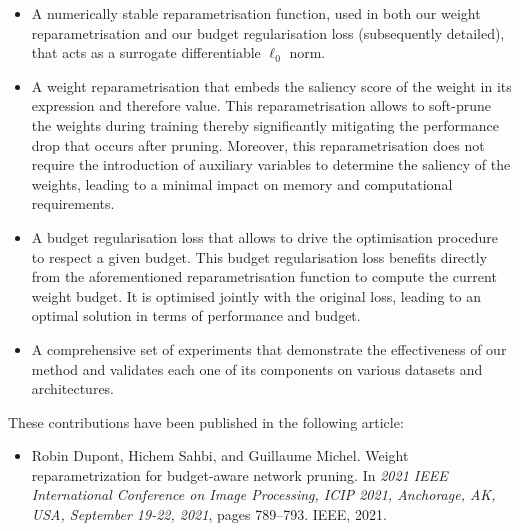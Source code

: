 \begin{itemize}
      \item A numerically stable reparametrisation function, used in both our
            weight reparametrisation and our budget regularisation loss
            (subsequently detailed), that acts as a surrogate differentiable
            $\ell_0$ norm.

      \item A weight reparametrisation that embeds the saliency score of the
            weight in its expression and therefore value. This reparametrisation
            allows to soft-prune the weights during training thereby significantly
            mitigating the performance drop that occurs after pruning. Moreover,
            this reparametrisation does not require the introduction of auxiliary
            variables to determine the saliency of the weights, leading to a
            minimal impact on memory and computational requirements.

      \item A budget regularisation loss that allows to drive the optimisation
            procedure to respect a given budget. This budget regularisation loss
            benefits directly from the aforementioned reparametrisation function
            to compute the current weight budget. It is optimised jointly with
            the original loss, leading to an optimal solution in terms of
            performance and budget.

      \item A comprehensive set of experiments that demonstrate the effectiveness
            of our method and validates each one of its components on various
            datasets and architectures.\\
\end{itemize}

\noindent These contributions have been published in the following article:
\begin{itemize}
      \item Robin Dupont, Hichem Sahbi, and Guillaume Michel. Weight
            reparametrization for budget-aware network pruning. In \emph{2021
            IEEE International Conference on Image Processing, ICIP 2021,
            Anchorage, AK, USA, September 19-22, 2021}, pages 789–793. IEEE,
            2021.\\
\end{itemize}



